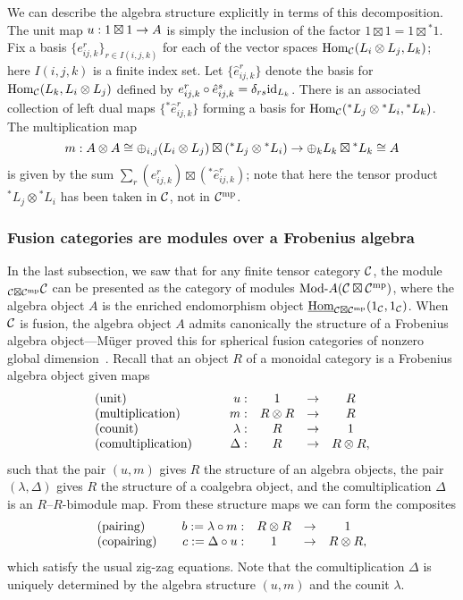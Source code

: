 \documentclass{amsart}
\begin{document}
We can describe the algebra structure explicitly in terms of this decomposition.  The unit map $u: 1 \boxtimes 1 \rightarrow A$ is simply the inclusion of the factor $1 \boxtimes 1 = 1 \boxtimes {}^*1$.  Fix a basis $\{e^r_{ij,k}\}_{r \in I(i,j,k)}$ for each of the vector spaces $\operatorname{Hom}_\mathcal C(L_i \otimes L_j,L_k)$; here $I(i,j,k)$ is a finite index set.  Let $\{\hat{e}^r_{ij,k}\}$ denote the basis for $\operatorname{Hom}_\mathcal C(L_k,L_i \otimes L_j)$ defined by $e^r_{ij,k} \circ \hat{e}^s_{ij,k} = \delta_{rs} \mathrm{id}_{L_k}$.  There is an associated collection of left dual maps $\{{}^*\hat{e}^r_{ij,k}\}$ forming a basis for $\operatorname{Hom}_\mathcal C({}^* L_j \otimes {}^* L_i, {}^* L_k)$.  The multiplication map
\[
m: A \otimes A \cong \oplus_{i,j} (L_i \otimes L_j) \boxtimes ({}^* L_j \otimes {}^* L_i) \rightarrow \oplus_k L_k \boxtimes {}^* L_k \cong A
\]
is given by the sum $\sum_r (e^r_{ij,k}) \boxtimes ({}^*\hat{e}^r_{ij,k})$; note that here the tensor product ${}^* L_j \otimes {}^* L_i$ has been taken in $\mathcal C$, not in $\mathcal C^{\mathrm{mp}}$.

\subsubsection{Fusion categories are modules over a Frobenius algebra}

In the last subsection, we saw that for any finite tensor category $\mathcal C$, the module ${}_{\mathcal C \boxtimes \mathcal C^{\mathrm{mp}}} \mathcal C$ can be presented as the category of modules $\Mod{}{A}(\cC \boxtimes \cC^\mp)$, where the algebra object $A$ is the enriched endomorphism object $\operatorname{\underline{Hom}}_{\mathcal C \boxtimes \mathcal C^{\mathrm{mp}}}(1_\mathcal C,1_\mathcal C)$.  When $\mathcal C$ is fusion, the algebra object $A$ admits canonically the structure of a Frobenius algebra object---M\"uger proved this for spherical fusion categories of nonzero global dimension~\cite{MR1966525}.  Recall that an object $R$ of a monoidal category is a Frobenius algebra object given maps
\begin{equation*}
	\begin{array}{l c  r c c c}
		\textrm{(unit)} & \quad & u: & 1 & \to & R \\
		\textrm{(multiplication)} && m: & R \otimes R & \to & R \\
		\textrm{(counit)} && \lambda: & R &\to &1 \\
		\textrm{(comultiplication)} && \Delta: & R &\to& R \otimes R,
	\end{array}
\end{equation*}
such that the pair $(u,m)$ gives $R$ the structure of an algebra objects, the pair $(\lambda, \Delta)$ gives $R$ the structure of a coalgebra object, and the comultiplication $\Delta$ is an $R$--$R$-bimodule map.  From these structure maps we can form the composites
\begin{equation*}
	\begin{array}{l c  r c c c}
		\textrm{(pairing)} && b := \lambda \circ m: & R \otimes R& \to& 1 \\
		\textrm{(copairing)} && c := \Delta \circ u: & 1&\to&  R \otimes R,
	\end{array}
\end{equation*}
which satisfy the usual zig-zag equations.  Note that the comultiplication $\Delta$ is uniquely determined by the algebra structure $(u,m)$ and the counit $\lambda$.
\end{document}
